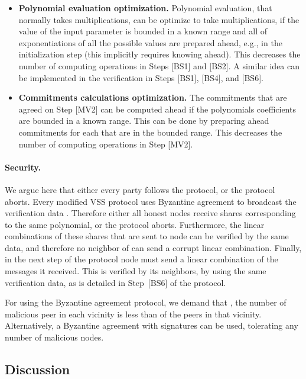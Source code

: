 \documentclass[10pt]{svjour3}
\begin{document}
\begin{itemize}
\item \textbf{Polynomial evaluation optimization.} Polynomial
evaluation, that normally takes 
multiplications, can be optimize to take  multiplications, if
the value of the input parameter is bounded in a known range and
all of  exponentiations of all the possible values are prepared
ahead, e.g., in the initialization step (this implicitly requires
knowing  ahead). This decreases the number of computing
operations in Steps [BS1]
and [BS2]. A similar idea can be implemented in the verification
in Steps [BS1],
[BS4], and [BS6].


\item \textbf{Commitments calculations optimization.} The
commitments that are agreed on Step [MV2]  can be computed ahead if the
polynomials coefficients are bounded in a known range. This can be
done by preparing ahead commitments 
for each  that are in the bounded range. This decreases the
number of computing operations in Step [MV2].

\end{itemize}

\paragraph{Security.} We argue here that either every party follows
the protocol, or the protocol aborts. Every modified VSS protocol uses
Byzantine agreement to broadcast the verification data
. Therefore either all honest nodes receive shares
corresponding to the same polynomial, or the protocol
aborts. Furthermore, the linear combinations of these shares that are
sent to node  can be verified by the same data, and therefore no
neighbor of  can send a corrupt linear combination.
Finally, in the next step of the protocol node  must send a linear
combination of the messages it received. This is verified by its
neighbors, by using the same verification data, as is detailed in
Step~[BS6] of the protocol.

For using the Byzantine agreement protocol, we demand that , the
number of malicious peer in each vicinity is less than  of the peers
in that vicinity. Alternatively, a Byzantine agreement with signatures
can be used, tolerating any number of malicious nodes.




\subsection{Discussion}
\label{insensitive}
\end{document}
